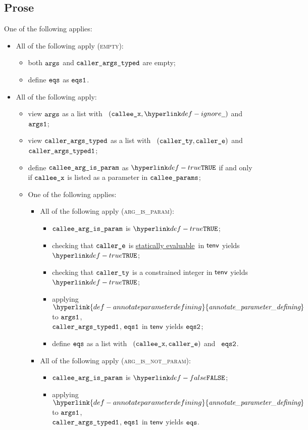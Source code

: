 \documentclass{book}
\newcommand\ProseOrTypeError[0]{\ProseTerminateAs{\TypeErrorConfig}}
\newcommand\staticallyevaluable[0]{\hyperlink{def-staticallyevaluable}{statically evaluable}}
\newcommand\annotateparameterdefining[0]{\hyperlink{def-annotateparameterdefining}{\textfunc{annotate\_parameter\_defining}}}
\begin{document}
\subsection{Prose}
One of the following applies:
\begin{itemize}
  \item All of the following apply (\textsc{empty}):
  \begin{itemize}
    \item both $\texttt{args}$ and $\texttt{caller\_args\_typed}$ are empty;
    \item define $\texttt{eqs}$ as $\texttt{eqs1}$.
  \end{itemize}

  \item All of the following apply:
  \begin{itemize}
    \item view $\texttt{args}$ as a list with \head\ $(\calleex, \Ignore)$ and \tail\ $\texttt{args1}$;
    \item view $\texttt{caller\_args\_typed}$ as a list with \head\ $(\texttt{caller\_ty}, \texttt{caller\_e})$ and \tail\ $\texttt{caller\_args\_typed1}$;
    \item define $\texttt{callee\_arg\_is\_param}$ as $\True$ if and only if $\texttt{callee\_x}$ is listed as a parameter in $\texttt{callee\_params}$;
    \item One of the following applies:
    \begin{itemize}
      \item All of the following apply (\textsc{arg\_is\_param}):
      \begin{itemize}
        \item $\texttt{callee\_arg\_is\_param}$ is $\True$;
        \item checking that $\texttt{caller\_e}$ is \staticallyevaluable\ in $\textsf{tenv}$ yields $\True$\ProseOrTypeError;
        \item checking that $\texttt{caller\_ty}$ is a constrained integer in $\textsf{tenv}$ yields \\
              $\True$\ProseOrTypeError;
        \item applying $\annotateparameterdefining$ to $\texttt{args1}$, \\
              $\texttt{caller\_args\_typed1}$, $\texttt{eqs1}$ in $\textsf{tenv}$ yields $\texttt{eqs2}$\ProseOrTypeError;
        \item define $\texttt{eqs}$ as a list with \head\ $(\texttt{callee\_x}, \texttt{caller\_e})$ and \tail\ $\texttt{eqs2}$.
      \end{itemize}

      \item All of the following apply (\textsc{arg\_is\_not\_param}):
      \begin{itemize}
        \item $\texttt{callee\_arg\_is\_param}$ is $\False$;
        \item applying $\annotateparameterdefining$ to $\texttt{args1}$, \\
              $\texttt{caller\_args\_typed1}$, $\texttt{eqs1}$ in $\textsf{tenv}$ yields $\texttt{eqs}$\ProseOrTypeError.
      \end{itemize}
    \end{itemize}
  \end{itemize}
\end{itemize}
\end{document}
